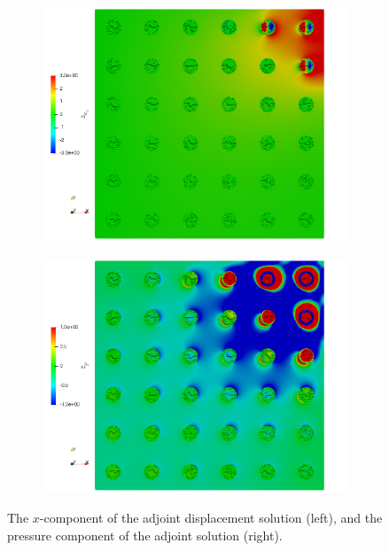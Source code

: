 \begin{figure}[ht!]
\centering
\begin{subfigure}{.5\textwidth}
\centering
\includegraphics[width=.99\linewidth]{img/aut_solder_zux.png}
\end{subfigure}%
\begin{subfigure}{0.5\textwidth}
\centering
\includegraphics[width=.99\linewidth]{img/aut_solder_zp.png}
\end{subfigure}
\caption{The $x$-component of the adjoint displacement solution
(left), and the pressure component of the adjoint solution
(right).}
\label{fig:aut_solder_adjoint}
\end{figure}

